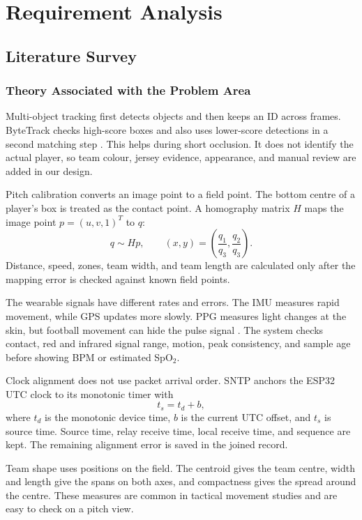 \section{Requirement Analysis}

\subsection{Literature Survey}

\subsubsection{Theory Associated with the Problem Area}
Multi-object tracking first detects objects and then keeps an ID across frames.
ByteTrack checks high-score boxes and also uses lower-score detections in a
second matching step \cite{zhang2022bytetrack}. This helps during short
occlusion. It does not identify the actual player, so team colour, jersey
evidence, appearance, and manual review are added in our design.

Pitch calibration converts an image point to a field point. The bottom centre
of a player's box is treated as the contact point. A homography matrix $H$ maps
the image point $p=(u,v,1)^T$ to $q$:
\begin{equation}
q \sim Hp, \qquad (x,y)=\left(\frac{q_1}{q_3},\frac{q_2}{q_3}\right).
\end{equation}
Distance, speed, zones, team width, and team length are calculated only after
the mapping error is checked against known field points.

The wearable signals have different rates and errors. The IMU measures rapid
movement, while GPS updates more slowly. PPG measures light changes at the
skin, but football movement can hide the pulse signal \cite{zhang2021ppg}. The
system checks contact, red and infrared signal range, motion, peak consistency,
and sample age before showing BPM or estimated SpO$_2$.

Clock alignment does not use packet arrival order. SNTP anchors the ESP32 UTC
clock to its monotonic timer with
\begin{equation}
t_s = t_d + b,
\end{equation}
where $t_d$ is the monotonic device time, $b$ is the current UTC offset, and
$t_s$ is source time. Source time, relay receive time, local receive time, and
sequence are kept. The remaining alignment error is saved in the joined record.

Team shape uses positions on the field. The centroid gives the team centre,
width and length give the spans on both axes, and compactness gives the spread
around the centre. These measures are common in tactical movement studies
\cite{ric2016tactical} and are easy to check on a pitch view.

